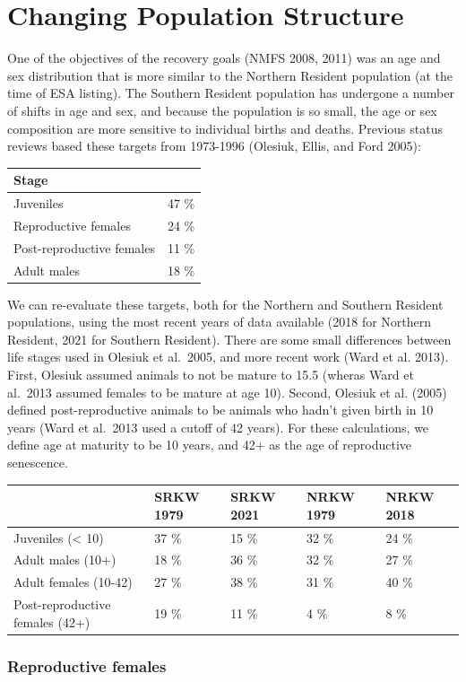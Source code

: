\documentclass[]{article}
\begin{document}
\hypertarget{changing-population-structure}{%
\section{Changing Population
Structure}\label{changing-population-structure}}

One of the objectives of the recovery goals (NMFS 2008, 2011) was an age
and sex distribution that is more similar to the Northern Resident
population (at the time of ESA listing). The Southern Resident
population has undergone a number of shifts in age and sex, and because
the population is so small, the age or sex composition are more
sensitive to individual births and deaths. Previous status reviews based
these targets from 1973-1996 (Olesiuk, Ellis, and Ford 2005):

\begin{longtable}[]{@{}ll@{}}
\toprule
Stage &\tabularnewline
\midrule
\endhead
Juveniles & 47 \%\tabularnewline
Reproductive females & 24 \%\tabularnewline
Post-reproductive females & 11 \%\tabularnewline
Adult males & 18 \%\tabularnewline
\bottomrule
\end{longtable}

We can re-evaluate these targets, both for the Northern and Southern
Resident populations, using the most recent years of data available
(2018 for Northern Resident, 2021 for Southern Resident). There are some
small differences between life stages used in Olesiuk et al.~2005, and
more recent work (Ward et al. 2013). First, Olesiuk assumed animals to
not be mature to 15.5 (wheras Ward et al.~2013 assumed females to be
mature at age 10). Second, Olesiuk et al. (2005) defined
post-reproductive animals to be animals who hadn't given birth in 10
years (Ward et al.~2013 used a cutoff of 42 years). For these
calculations, we define age at maturity to be 10 years, and 42+ as the
age of reproductive senescence.

\begin{longtable}[]{@{}lllll@{}}
\toprule
& SRKW 1979 & SRKW 2021 & NRKW 1979 & NRKW 2018\tabularnewline
\midrule
\endhead
Juveniles (\textless{} 10) & 37 \% & 15 \% & 32 \% & 24
\%\tabularnewline
Adult males (10+) & 18 \% & 36 \% & 32 \% & 27 \%\tabularnewline
Adult females (10-42) & 27 \% & 38 \% & 31 \% & 40 \%\tabularnewline
Post-reproductive females (42+) & 19 \% & 11 \% & 4 \% & 8
\%\tabularnewline
\bottomrule
\end{longtable}

\hypertarget{reproductive-females}{%
\subsubsection{Reproductive females}\label{reproductive-females}}
\end{document}
